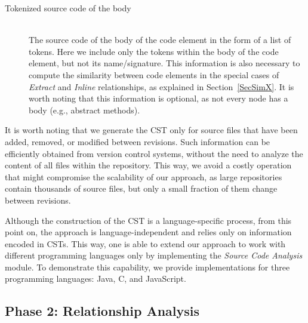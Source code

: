 \begin{description}
    
    \item[Tokenized source code of the body]  \hfill \\
    The source code of the body of the code element in the form of a list of tokens.
    Here we include only the tokens within the body of the code element, but not its name/signature.
    This information is also necessary to compute the similarity between code elements in the special cases of \textit{Extract} and \textit{Inline} relationships, as explained in Section~\ref{SecSimX}.
    It is worth noting that this information is optional, as not every node has a body (e.g., abstract methods).
    
\end{description}

It is worth noting that we generate the CST only for source files that have been added, removed, or modified between revisions. 
Such information can be efficiently obtained from version control systems, without the need to analyze the content of all files within the repository.
This way, we avoid a costly operation that might compromise the scalability of our approach, as large repositories contain thousands of source files, but only a small fraction of them change between revisions.

Although the construction of the CST is a language-specific process, from this point on, the approach is language-independent and relies only on information encoded in CSTs.
This way, one is able to extend our approach to work with different programming languages only by implementing the \emph{Source Code Analysis} module.
To demonstrate this capability, we provide implementations for three programming languages: Java, C, and JavaScript.


\subsection{Phase 2: Relationship Analysis}

